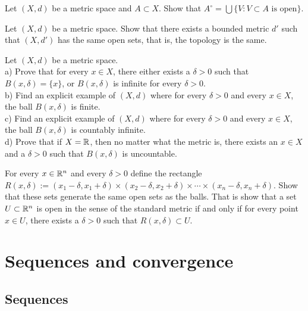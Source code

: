 \begin{exercise}
Let $(X,d)$ be a metric space and $A \subset X$.  Show that
$A^\circ = \bigcup \{ V : V \subset A \text{ is open} \}$.
\end{exercise}

\begin{exercise}
Let $(X,d)$ be a metric space.  Show that there exists a bounded metric
$d'$ such that $(X,d')$ has the same open sets, that is, the topology is
the same.
\end{exercise}

\begin{exercise}
Let $(X,d)$ be a metric space.\\
a) Prove that for every $x \in X$, there either exists a $\delta > 0$ such that
$B(x,\delta) = \{ x \}$, or $B(x,\delta)$ is infinite for every $\delta >  0$.
\\
b) Find an explicit example of $(X,d)$ where for every $\delta > 0$ and
every $x \in X$, the
ball $B(x,\delta)$ is finite.
\\
c) Find an explicit example of $(X,d)$ where for every $\delta > 0$ and
every $x \in X$, the
ball $B(x,\delta)$ is countably infinite.
\\
d) Prove that if $X = {\mathbb{R}}$, then no matter what the metric is, there exists
an $x \in X$ and a $\delta > 0$ such that $B(x,\delta)$ is uncountable.
\end{exercise}

\begin{exercise}
For every $x \in {\mathbb{R}}^n$ and every $\delta > 0$ define the rectangle
$R(x,\delta) :=
(x_1-\delta,x_1+\delta) \times
(x_2-\delta,x_2+\delta) \times \cdots \times
(x_n-\delta,x_n+\delta)$.  Show that these sets generate the same open
sets as the balls.  That is show that a set $U \subset {\mathbb{R}}^n$
is open in the sense of the standard metric if and only if for every
point $x \in U$, there exists a $\delta > 0$ such that $R(x,\delta) \subset
U$.
\end{exercise}


\sectionnewpage
\section{Sequences and convergence}
\label{sec:metseqs}


\subsection{Sequences}

